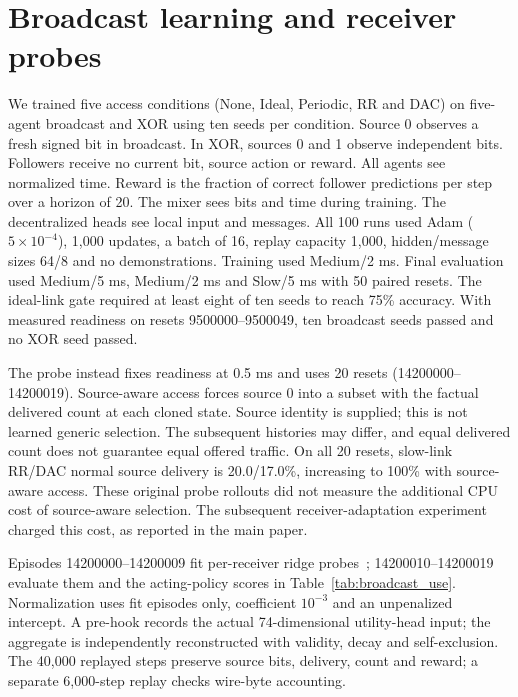 \documentclass[pdflatex,sn-mathphys-num]{sn-jnl}
\begin{document}
\section{Broadcast learning and receiver probes}\label{app:probe}
We trained five access conditions (None, Ideal, Periodic, RR and DAC) on five-agent broadcast and XOR using ten seeds per condition. Source 0 observes a fresh signed bit in broadcast. In XOR, sources 0 and 1 observe independent bits. Followers receive no current bit, source action or reward. All agents see normalized time. Reward is the fraction of correct follower predictions per step over a horizon of 20. The mixer sees bits and time during training. The decentralized heads see local input and messages. All 100 runs used Adam ($5\times10^{-4}$), 1,000 updates, a batch of 16, replay capacity 1,000, hidden/message sizes 64/8 and no demonstrations. Training used Medium/2 ms. Final evaluation used Medium/5 ms, Medium/2 ms and Slow/5 ms with 50 paired resets. The ideal-link gate required at least eight of ten seeds to reach 75\% accuracy. With measured readiness on resets 9500000--9500049, ten broadcast seeds passed and no XOR seed passed.

The probe instead fixes readiness at 0.5 ms and uses 20 resets (14200000--14200019). Source-aware access forces source 0 into a subset with the factual delivered count at each cloned state. Source identity is supplied; this is not learned generic selection. The subsequent histories may differ, and equal delivered count does not guarantee equal offered traffic. On all 20 resets, slow-link RR/DAC normal source delivery is 20.0/17.0\%, increasing to 100\% with source-aware access. These original probe rollouts did not measure the additional CPU cost of source-aware selection. The subsequent receiver-adaptation experiment charged this cost, as reported in the main paper.

Episodes 14200000--14200009 fit per-receiver ridge probes~\citep{hoerl1970ridge}; 14200010--14200019 evaluate them and the acting-policy scores in Table~\ref{tab:broadcast_use}. Normalization uses fit episodes only, coefficient $10^{-3}$ and an unpenalized intercept. A pre-hook records the actual 74-dimensional utility-head input; the aggregate is independently reconstructed with validity, decay and self-exclusion. The 40,000 replayed steps preserve source bits, delivery, count and reward; a separate 6,000-step replay checks wire-byte accounting.
\end{document}
